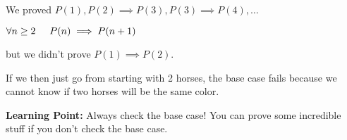 \documentclass[11pt]{article}
\begin{document}
We proved \(P(1),  P(2)\implies P(3), P(3) \implies P(4), \ldots\)
\begin{center}
\(\forall n \geq 2 \hspace{.5cm} P(n) \implies P(n+1)\)
\end{center}
but we didn't prove \(P(1) \implies P(2)\).

If we then just go from starting with 2 horses, the base case fails because we cannot know if two horses will be the same color.

\textbf{Learning Point:} Always check the base case! You can prove some incredible stuff if you don't check the base case.

\end{document}

